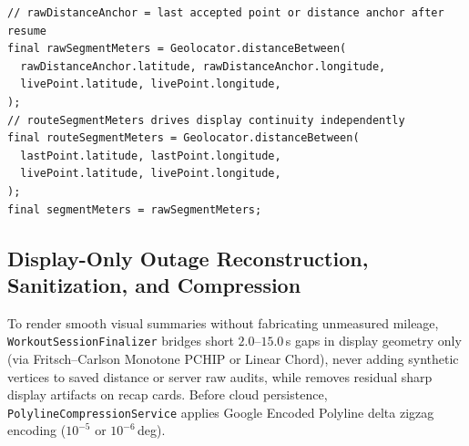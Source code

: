 \begin{lstlisting}[caption={Separation of accumulated route distance and smoothed visual display in \texttt{WorkoutTrackingEngine}.},label={lst:gps_distance}]
// rawDistanceAnchor = last accepted point or distance anchor after resume
final rawSegmentMeters = Geolocator.distanceBetween(
  rawDistanceAnchor.latitude, rawDistanceAnchor.longitude,
  livePoint.latitude, livePoint.longitude,
);
// routeSegmentMeters drives display continuity independently
final routeSegmentMeters = Geolocator.distanceBetween(
  lastPoint.latitude, lastPoint.longitude,
  livePoint.latitude, livePoint.longitude,
);
final segmentMeters = rawSegmentMeters;
\end{lstlisting}

\subsection{Display-Only Outage Reconstruction, Sanitization, and Compression}
To render smooth visual summaries without fabricating unmeasured mileage, \texttt{WorkoutSessionFinalizer} bridges short $2.0$--$15.0$\,s gaps in display geometry only (via Fritsch--Carlson Monotone PCHIP or Linear Chord), never adding synthetic vertices to saved distance or server raw audits, while  removes residual sharp display artifacts on recap cards. Before cloud persistence, \texttt{PolylineCompressionService} applies Google Encoded Polyline delta zigzag encoding ($10^{-5}$ or $10^{-6}$\,deg).

